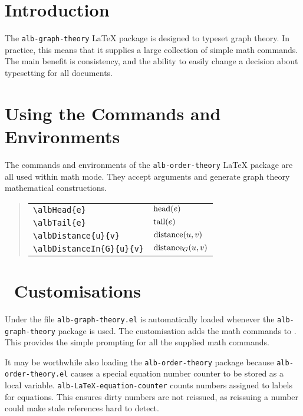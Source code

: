 \documentclass[11pt,a4paper,oneside,titlepage]{alb-corp}
\begin{document}

\section{Introduction}
\label{sec:alb-graph-theory-documentation:intr}

The \texttt{alb-graph-theory} \LaTeX{} package is designed to typeset
graph theory.  In practice, this means that it supplies a large
collection of simple math commands.  The main benefit is consistency,
and the ability to easily change a decision about typesetting for all
documents.




\section{Using the Commands and Environments}
\label{sec:alb-order-theory-documentation:using-comm-envir}

The commands and environments of the \texttt{alb-order-theory} \LaTeX{}
package are all used within math mode.  They accept arguments and
generate graph theory mathematical constructions.

\begin{quote}
  \begin{tabular}{p{}@{\qquad}p{}}
    \verb$\albHead{e}$ & $\operatorname{head}(e)$ \\
    \verb$\albTail{e}$ & $\operatorname{tail}(e)$ \\
    \verb$\albDistance{u}{v}$ & $\operatorname{distance}(u, v)$ \\
    \verb$\albDistanceIn{G}{u}{v}$ & $\albDistanceIn{G}{u}{v}$
  \end{tabular}
\end{quote}




\section{\AUCTeX\ Customisations}
\label{sec:alb-graph-theory-documentation:auctex-cust}

Under \AUCTeX{} the file \texttt{alb-graph-theory.el} is automatically
loaded whenever the \texttt{alb-graph-theory} package is used.  The
customisation adds the math commands to \AUCTeX{}.  This provides the
simple prompting for all the supplied math commands.

It may be worthwhile also loading the \texttt{alb-order-theory} package
because \texttt{alb-order-theory.el} causes a special equation number
counter to be stored as a local variable.
\texttt{alb-LaTeX-equation-counter} counts numbers assigned to labels
for equations.  This ensures dirty numbers are not reissued, as
reissuing a number could make stale references hard to detect.
\end{document}
